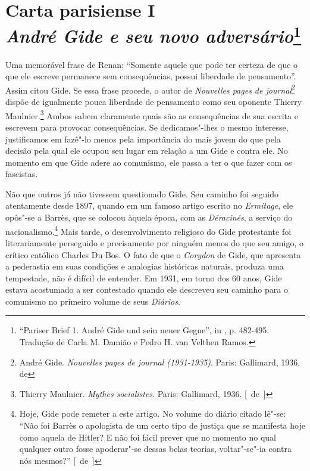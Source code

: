 \chapter{Carta parisiense I\\ \emph{André Gide e seu novo adversário}\footnote[*]{``Pariser Brief 1. André Gide und sein neuer Gegne'', in
  , p. 482-495. Tradução de Carla M. Damião e Pedro H. van Velthen Ramos.}}


Uma memorável frase de Renan: ``Somente aquele que pode ter certeza de
que o que ele escreve permanece sem consequências, possui liberdade de
pensamento''. Assim citou Gide. Se essa frase procede, o autor de
\emph{Nouvelles pages de journal}\footnote{André Gide.
  \emph{Nouvelles pages de journal (1931-1935)}. Paris: Gallimard, 1936. \versal{[N.} de \versal{W.~B.]}}
dispõe de igualmente pouca liberdade de pensamento como seu oponente
Thierry Maulnier.\footnote{Thierry Maulnier. \emph{Mythes
  socialistes}. Paris: Gallimard, 1936. [~de~]} Ambos sabem claramente quais
são as consequências de sua escrita e escrevem para provocar
consequências. Se dedicamos"-lhes o mesmo interesse, justificamos em
fazê"-lo menos pela importância do mais jovem do que pela decisão pela
qual ele ocupou seu lugar em relação a um Gide e contra ele. No
momento em que Gide adere ao comunismo, ele passa a ter o que fazer com
os fascistas.

Não que outros já não tivessem questionado Gide. Seu caminho foi seguido
atentamente desde 1897, quando em um famoso artigo escrito no
\emph{Ermitage}, ele opôs"-se a Barrès, que se colocou àquela época, com
as \emph{Déracinés}, a serviço do nacionalismo.\footnote{Hoje, Gide
  pode remeter a este artigo. No volume do diário citado lê"-se: ``Não
  foi Barrès o apologista de um certo tipo de justiça que se manifesta
  hoje como aquela de Hitler? E não foi fácil prever que no momento no
  qual qualquer outro fosse apoderar"-se dessas belas teorias,
  voltar"-se"-ia contra nós mesmos?'' [~de~]} Mais tarde, o desenvolvimento
religioso do Gide protestante foi literariamente perseguido e
precisamente por ninguém menos do que seu amigo, o crítico católico
Charles Du Bos. O fato de que o \emph{Corydon} de Gide, que apresenta a pederastia
em suas condições e analogias históricas naturais, produza uma
tempestade, não é difícil de entender. Em 1931, em torno dos 60 anos,
Gide estava acostumado a ser contestado quando ele descreveu seu caminho
para o comunismo no primeiro volume de seus \emph{Diários}.

